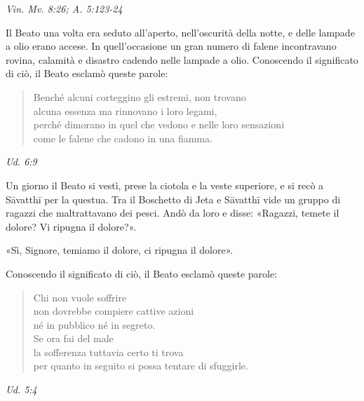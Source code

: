 \emph{Vin. Mv. 8:26; A. 5:123-24}


 Il Beato una volta era seduto all’aperto, nell’oscurità
della notte, e delle lampade a olio erano accese. In quell’occasione un
gran numero di falene incontravano rovina, calamità e disastro cadendo
nelle lampade a olio. Conoscendo il significato di ciò, il Beato esclamò
queste parole:


\begin{quote}
Benché alcuni corteggino gli estremi, non trovano \\
alcuna essenza ma rinnovano i loro legami, \\
perché dimorano in quel che vedono e nelle loro sensazioni \\
come le falene che cadono in una fiamma.
\end{quote}

\emph{Ud. 6:9}


Un giorno il Beato si vestì, prese la ciotola e la veste superiore, e si
recò a Sāvatthī per la questua. Tra il Boschetto di Jeta e Sāvatthī vide
un gruppo di ragazzi che maltrattavano dei pesci. Andò da loro e disse:
«Ragazzi, temete il dolore? Vi ripugna il dolore?».


«Sì, Signore, temiamo il dolore, ci ripugna il dolore».


Conoscendo il significato di ciò, il Beato esclamò queste parole:


\begin{quote}
Chi non vuole soffrire \\
non dovrebbe compiere cattive azioni \\
né in pubblico né in segreto. \\
Se ora fai del male \\
la sofferenza tuttavia certo ti trova \\
per quanto in seguito si possa tentare di sfuggirle.
\end{quote}

\emph{Ud. 5:4}


